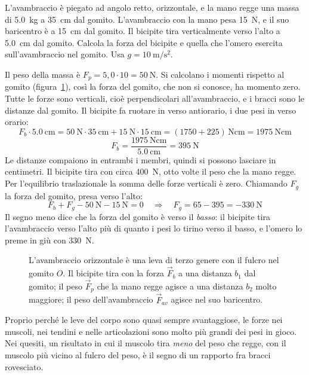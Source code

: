 \begin{esempio}[il bicipite]
L'avambraccio è piegato ad angolo retto, orizzontale, e la mano regge una massa di \SI{5,0}{\kilo\gram} a \SI{35}{\centi\metre} dal gomito. L'avambraccio con la mano pesa \SI{15}{\newton}, e il suo baricentro è a \SI{15}{\centi\metre} dal gomito. Il bicipite tira verticalmente verso l'alto a \SI{5,0}{\centi\metre} dal gomito. Calcola la forza del bicipite e quella che l'omero esercita sull'avambraccio nel gomito. Usa $g = \SI{10}{\metre\per\second\squared}$.

Il peso della massa è $F_p = 5{,}0 \cdot 10 = \SI{50}{\newton}$. Si calcolano i momenti rispetto al gomito (figura~\ref{fig:ud2-avambraccio}), così la forza del gomito, che non si conosce, ha momento zero. Tutte le forze sono verticali, cioè perpendicolari all'avambraccio, e i bracci sono le distanze dal gomito. Il bicipite fa ruotare in verso antiorario, i due pesi in verso orario:
\[
  F_b \cdot \SI{5,0}{\centi\metre} = \SI{50}{\newton} \cdot \SI{35}{\centi\metre} + \SI{15}{\newton} \cdot \SI{15}{\centi\metre} = (1750 + 225)\,\si{\newton\centi\metre} = \SI{1975}{\newton\centi\metre}
\]
\[
  F_b = \frac{\SI{1975}{\newton\centi\metre}}{\SI{5,0}{\centi\metre}} = \SI{395}{\newton}
\]
Le distanze compaiono in entrambi i membri, quindi si possono lasciare in centimetri. Il bicipite tira con circa \SI{400}{\newton}, otto volte il peso che la mano regge. Per l'equilibrio traslazionale la somma delle forze verticali è zero. Chiamando $F_g$ la forza del gomito, presa verso l'alto:
\[
  F_b + F_g - \SI{50}{\newton} - \SI{15}{\newton} = 0
  \quad\Longrightarrow\quad
  F_g = 65 - 395 = \SI{-330}{\newton}
\]
Il segno meno dice che la forza del gomito è verso il \emph{basso}: il bicipite tira l'avambraccio verso l'alto più di quanto i pesi lo tirino verso il basso, e l'omero lo preme in giù con \SI{330}{\newton}.
\end{esempio}

\begin{figure}[h]
\centering

\caption{L'avambraccio orizzontale è una leva di terzo genere con il fulcro nel gomito $O$. Il bicipite tira con la forza $\vec F_b$ a una distanza $b_1$ dal gomito; il peso $\vec F_p$ che la mano regge agisce a una distanza $b_2$ molto maggiore; il peso dell'avambraccio $\vec F_{av}$ agisce nel suo baricentro.}
\label{fig:ud2-avambraccio}
\end{figure}

\begin{attenzione}
Proprio perché le leve del corpo sono quasi sempre svantaggiose, le forze nei muscoli, nei tendini e nelle articolazioni sono molto più grandi dei pesi in gioco. Nei quesiti, un risultato in cui il muscolo tira \emph{meno} del peso che regge, con il muscolo più vicino al fulcro del peso, è il segno di un rapporto fra bracci rovesciato.
\end{attenzione}

